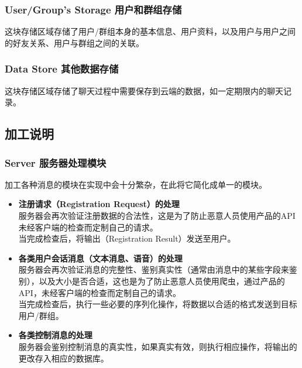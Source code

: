 \subsubsection{User/Group's Storage 用户和群组存储}

这块存储区域存储了用户/群组本身的基本信息、用户资料，以及用户与用户之间的好友关系、用户与群组之间的关联。

\subsubsection{Data Store 其他数据存储}
这块存储区域存储了聊天过程中需要保存到云端的数据，如一定期限内的聊天记录。

\subsection{加工说明}
\subsubsection{Server 服务器处理模块}

加工各种消息的模块在实现中会十分繁杂，在此将它简化成单一的模块。

\begin{itemize}
    \item \textbf{注册请求（Registration Request）的处理}\\
    服务器会再次验证注册数据的合法性，这是为了防止恶意人员使用产品的API未经客户端的检查而定制自己的请求。\\
    当完成检查后，将输出（Registration Result）发送至用户。
    \item \textbf{各类用户会话消息（文本消息、语音）的处理}\\
    服务器会再次验证消息的完整性、鉴别真实性（通常由消息中的某些字段来鉴别），以及大小是否合适，这也是为了防止恶意人员使用爬虫，通过产品的API，未经客户端的检查而定制自己的请求。\\
    当完成检查后，执行一些必要的序列化操作，将数据以合适的格式发送到目标用户/群组。
    \item \textbf{各类控制消息的处理}\\
    服务器会鉴别控制消息的真实性，如果真实有效，则执行相应操作，将输出的更改存入相应的数据库。
\end{itemize}

